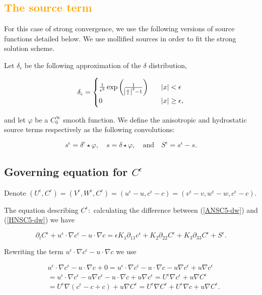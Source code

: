 \documentclass[11pt]{article}
\begin{document}
\subsection{\textcolor{orange}{The source term}}

For this case of strong convergence, we use the following versions of source functions detailed below. We use mollified sources in order to fit the strong solution scheme.

Let $\delta_\epsilon$ be the following approximation of the $\delta$ distribution,

\[   
\delta_\epsilon = 
  \begin{cases}
       \frac{1}{\epsilon^3} \exp{\bigg ( \frac{1}{\abs{{\frac{x}{\epsilon}}}^2-1} \bigg ) } &\quad \abs{x} < \epsilon \\
       0 &\quad \abs{x} \geq \epsilon, \\
  \end{cases}
\]

and let $\varphi$ be a $C^\infty_0$ smooth function. We define the anisotropic and hydrostatic source terms respectively as the following convolutions:

$$ s^\epsilon = \delta^\epsilon \star \varphi, \quad s = \delta \star \varphi, \quad \text{and} \quad S^\epsilon = s^\epsilon - s.$$
    
\subsection{Governing equation for $C^\epsilon$}

Denote $(U^\epsilon, C^\epsilon) = (V^\epsilon, W^\epsilon, C^\epsilon) = (u^\epsilon - u, c^\epsilon - c) = (v^\epsilon - v, w^\epsilon - w, c^\epsilon - c).$

The equation describing $C^\epsilon:$ calculating the difference between (\ref{ANSC5-dw}) and (\ref{HNSC5-dw}) we have

$$ \partial_t C^\epsilon + u^\epsilon \cdot \nabla c^\epsilon - u \cdot \nabla c = \epsilon K_1 \partial_{11} c^\epsilon + K_2 \partial_{22} C^\epsilon + K_3 \partial_{33} C^\epsilon + S^\epsilon.$$

Rewriting the term $u^\epsilon \cdot \nabla c^\epsilon - u \cdot \nabla c$ we use

\begin{equation}
  \begin{split}
    & u^\epsilon \cdot \nabla c^\epsilon - u \cdot \nabla c + 0 = u^\epsilon \cdot \nabla c^\epsilon - u \cdot \nabla c - u \nabla c^\epsilon + u \nabla c^\epsilon \\
    & = u^\epsilon \cdot \nabla c^\epsilon - u \nabla c^\epsilon - u \cdot \nabla c + u \nabla c^\epsilon = U^\epsilon \nabla c^\epsilon + u \nabla C^\epsilon \\
    & = U^\epsilon \nabla (c^\epsilon - c + c) + u \nabla C^\epsilon = U^\epsilon \nabla C^\epsilon  + U^\epsilon \nabla c+ u \nabla C^\epsilon.
  \end{split}
\end{equation}
\end{document}
